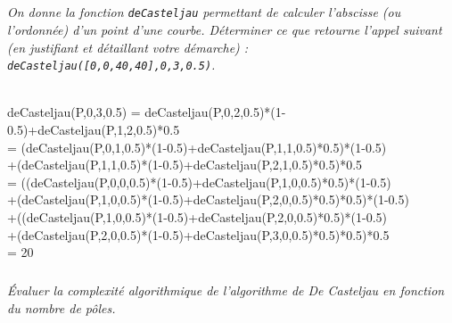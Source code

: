 \documentclass[10pt,fleqn]{article} %
\begin{document}
\subparagraph{}
\textit{On donne la fonction \texttt{deCasteljau} permettant de calculer l'abscisse (ou l'ordonnée) d'un point d'une courbe. Déterminer ce que retourne l'appel suivant (en justifiant et détaillant votre démarche) : ~\\
\texttt{deCasteljau([0,0,40,40],0,3,0.5)}.}
\ifprof
\begin{corrige} ~\\

\noindent deCasteljau(P,0,3,0.5) =  deCasteljau(P,0,2,0.5)*(1-0.5)+deCasteljau(P,1,2,0.5)*0.5 ~\\

\noindent  = (deCasteljau(P,0,1,0.5)*(1-0.5)+deCasteljau(P,1,1,0.5)*0.5)*(1-0.5) ~\\ 
\indent+(deCasteljau(P,1,1,0.5)*(1-0.5)+deCasteljau(P,2,1,0.5)*0.5)*0.5 ~\\

\noindent  = ((deCasteljau(P,0,0,0.5)*(1-0.5)+deCasteljau(P,1,0,0.5)*0.5)*(1-0.5)~\\ 
\indent +(deCasteljau(P,1,0,0.5)*(1-0.5)+deCasteljau(P,2,0,0.5)*0.5)*0.5)*(1-0.5) ~\\ 
\indent+((deCasteljau(P,1,0,0.5)*(1-0.5)+deCasteljau(P,2,0,0.5)*0.5)*(1-0.5)  ~\\
\indent +(deCasteljau(P,2,0,0.5)*(1-0.5)+deCasteljau(P,3,0,0.5)*0.5)*0.5)*0.5 ~\\

\noindent  = 20
\end{corrige}
\else
\fi

\subparagraph{}
\textit{Évaluer la complexité algorithmique de l'algorithme de De Casteljau en fonction du nombre de pôles.}
\ifprof
\begin{corrige}
\end{corrige}
\else
\fi
\end{document}
